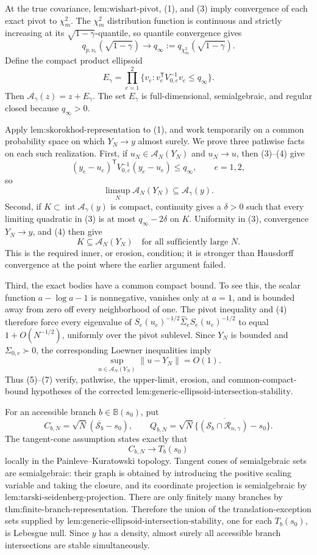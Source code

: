 At the true covariance, \(\text{lem:wishart-pivot}\), (1), and (3) imply convergence of each exact pivot to \(\chi_m^2\).  The \(\chi_m^2\) distribution function is continuous and strictly increasing at its \(\sqrt{1-\gamma}\)-quantile, so quantile convergence gives
\[
 q_{p,\nu_e}(\sqrt{1-\gamma})\longrightarrow
 q_\infty:=q_{\chi_m^2}(\sqrt{1-\gamma}). \tag{4}
\]
Define the compact product ellipsoid
\[
 E_\gamma=\prod_{e=1}^2
 \{v_e:v_e^{\mathsf T}V_{0,e}^{-1}v_e\le q_\infty\}.
\]
Then \(\mathcal A_\gamma(z)=z+E_\gamma\).  The set \(E_\gamma\) is full-dimensional, semialgebraic, and regular closed because \(q_\infty>0\).

Apply \(\text{lem:skorokhod-representation}\) to (1), and work temporarily on a common probability space on which \(Y_N\to y\) almost surely.  We prove three pathwise facts on each such realization.  First, if \(u_N\in\mathcal A_N(Y_N)\) and \(u_N\to u\), then (3)--(4) give
\[
 (y_e-u_e)^{\mathsf T}V_{0,e}^{-1}(y_e-u_e)\le q_\infty,
 \qquad e=1,2,
\]
so
\[
 \limsup_N\mathcal A_N(Y_N)\subseteq\mathcal A_\gamma(y). \tag{5}
\]
Second, if \(K\subset\operatorname{int}\mathcal A_\gamma(y)\) is compact, continuity gives a \(\delta>0\) such that every limiting quadratic in (3) is at most \(q_\infty-2\delta\) on \(K\).  Uniformity in (3), convergence \(Y_N\to y\), and (4) then give
\[
 K\subseteq\mathcal A_N(Y_N)\quad\text{for all sufficiently large }N. \tag{6}
\]
This is the required inner, or erosion, condition; it is stronger than Hausdorff convergence at the point where the earlier argument failed.

Third, the exact bodies have a common compact bound.  To see this, the scalar function \(a-\log a-1\) is nonnegative, vanishes only at \(a=1\), and is bounded away from zero off every neighborhood of one.  The pivot inequality and (4) therefore force every eigenvalue of
\(S_e(u_e)^{-1/2}\widehat\Sigma_eS_e(u_e)^{-1/2}\) to equal \(1+O(N^{-1/2})\), uniformly over the pivot sublevel.  Since \(Y_N\) is bounded and \(\Sigma_{0,e}\succ0\), the corresponding Loewner inequalities imply
\[
 \sup_{u\in\mathcal A_N(Y_N)}\lVert u-Y_N\rVert=O(1). \tag{7}
\]
Thus (5)--(7) verify, pathwise, the upper-limit, erosion, and common-compact-bound hypotheses of the corrected \(\text{lem:generic-ellipsoid-intersection-stability}\).

For an accessible branch \(b\in\mathbb B(s_0)\), put
\[
 C_{b,N}=\sqrt N(\overline{\mathcal S_b}-s_0),
 \qquad
 Q_{b,N}=\overline{\sqrt N\{(\mathcal S_b\cap\mathcal R_{n,\gamma})-s_0\}}.
\]
The tangent-cone assumption states exactly that
\[
 C_{b,N}\longrightarrow T_b(s_0) \tag{8}
\]
locally in the Painleve--Kuratowski topology.  Tangent cones of semialgebraic sets are semialgebraic: their graph is obtained by introducing the positive scaling variable and taking the closure, and its coordinate projection is semialgebraic by \(\text{lem:tarski-seidenberg-projection}\).  There are only finitely many branches by \(\text{thm:finite-branch-representation}\).  Therefore the union of the translation-exception sets supplied by \(\text{lem:generic-ellipsoid-intersection-stability}\), one for each \(T_b(s_0)\), is Lebesgue null.  Since \(y\) has a density, almost surely all accessible branch intersections are stable simultaneously.

